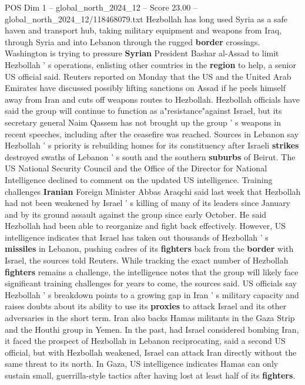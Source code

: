 \begin{textsample}{POS Dim 1 – global\_north\_2024\_12 – Score 23.00 – global\_north\_2024\_12/118468079.txt}
Hezbollah has long used Syria as a safe haven and transport hub, taking military equipment and weapons from Iraq, through Syria and into Lebanon through the rugged \textbf{border} crossings.
Washington is trying to pressure \textbf{Syrian} President Bashar al-Assad to limit Hezbollah ' s operations, enlisting other countries in the \textbf{region} to help, a senior US official said.
Reuters reported on Monday that the US and the United Arab Emirates have discussed possibly lifting sanctions on Assad if he peels himself away from Iran and cuts off weapons routes to Hezbollah.
Hezbollah officials have said the group will continue to function as a"resistance"against Israel, but its secretary general Naim Qassem has not brought up the group ' s weapons in recent speeches, including after the ceasefire was reached.
Sources in Lebanon say Hezbollah ' s priority is rebuilding homes for its constituency after Israeli \textbf{strikes} destroyed swaths of Lebanon ' s south and the southern \textbf{suburbs} of Beirut.
The US National Security Council and the Office of the Director for National Intelligence declined to comment on the updated US intelligence.
Training challenges \textbf{Iranian} Foreign Minister Abbas Araqchi said last week that Hezbollah had not been weakened by Israel ' s killing of many of its leaders since January and by its ground assault against the group since early October.
He said Hezbollah had been able to reorganize and fight back effectively.
However, US intelligence indicates that Israel has taken out thousands of Hezbollah ' s \textbf{missiles} in Lebanon, pushing cadres of its \textbf{fighters} back from the \textbf{border} with Israel, the sources told Reuters.
While tracking the exact number of Hezbollah \textbf{fighters} remains a challenge, the intelligence notes that the group will likely face significant training challenges for years to come, the sources said.
US officials say Hezbollah ' s breakdown points to a growing gap in Iran ' s military capacity and raises doubts about its ability to use its \textbf{proxies} to attack Israel and its other adversaries in the short term.
Iran also backs Hamas militants in the Gaza Strip and the Houthi group in Yemen.
In the past, had Israel considered bombing Iran, it faced the prospect of Hezbollah in Lebanon reciprocating, said a second US official, but with Hezbollah weakened, Israel can attack Iran directly without the same threat to its north.
In Gaza, US intelligence indicates Hamas can only sustain small, guerrilla-style tactics after having lost at least half of its \textbf{fighters}.

\end{textsample}
